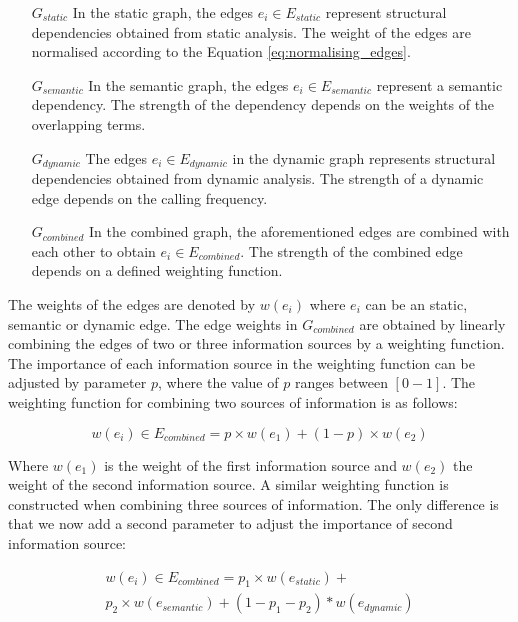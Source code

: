 \begin{itemize}
    \item[$G_{static}$] In the static graph, the edges $e_i \in E_{static}$ represent structural dependencies obtained from static analysis. The weight of the edges are normalised according to the Equation \ref{eq:normalising_edges}.
    \item[$G_{semantic}$] In the semantic graph, the edges $e_i \in E_{semantic}$ represent a semantic dependency. The strength of the dependency depends on the weights of the overlapping terms.
    \item[$G_{dynamic}$] The edges $e_i \in E_{dynamic}$ in the dynamic graph represents structural dependencies obtained from dynamic analysis. The strength of a dynamic edge depends on the calling frequency.
    \item[$G_{combined}$] In the combined graph, the aforementioned edges are combined with each other to obtain $e_i \in E_{combined}$. The strength of the combined edge depends on a defined weighting function.
\end{itemize}

The weights of the edges are denoted by $w(e_i)$ where $e_i$ can be an static, semantic or dynamic edge. The edge weights in $G_{combined}$ are obtained by linearly combining the edges of two or three information sources by a weighting function. The importance of each information source in the weighting function can be adjusted by parameter $p$, where the value of $p$ ranges between $[0-1]$. The weighting function for combining two sources of information is as follows:

\begin{equation}\label{eq:weighting_function_2_sources}
    w(e_i) \in E_{combined} = p \times w(e_{1}) + (1-p) \times w(e_{2})
\end{equation}

Where $w(e_1)$ is the weight of the first information source and $w(e_2)$ the weight of the second information source. A similar weighting function is constructed when combining three sources of information. The only difference is that we now add a second parameter to adjust the importance of second information source:

\begin{equation}
    \begin{split}
    w(e_i) \in E_{combined} = p_1 \times w(e_{static})  + \\
    p_2 \times w(e_{semantic}) + (1-p_1-p_2) * w(e_{dynamic})    
    \end{split}
\end{equation}

